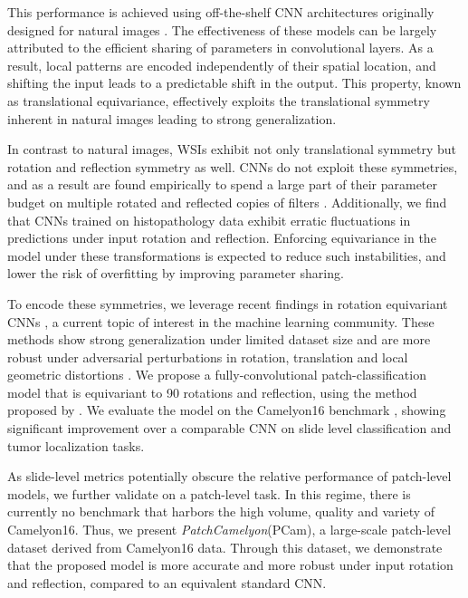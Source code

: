 \documentclass{llncs}
\begin{document}
    This performance is achieved using off-the-shelf CNN architectures originally designed for natural images \cite{Litjens2017-zt}. The effectiveness of these models can be largely attributed to the efficient sharing of parameters in convolutional layers. As a result, local patterns are encoded independently of their spatial location, and shifting the input leads to a predictable shift in the output. This property, known as translational equivariance, effectively exploits the translational symmetry inherent in natural images leading to strong generalization.
    

    
    In contrast to natural images, WSIs exhibit not only translational symmetry but rotation and reflection symmetry as well. CNNs do not exploit these symmetries, and as a result are found empirically to spend a large part of their parameter budget on multiple rotated and reflected copies of filters \cite{zeiler2014visualizing}.  Additionally, we find that CNNs trained on histopathology data exhibit erratic fluctuations in predictions under input rotation and reflection. Enforcing equivariance in the model under these transformations is expected to reduce such instabilities, and lower the risk of overfitting by improving parameter sharing.


    
    To encode these symmetries, we leverage recent findings in rotation equivariant CNNs \cite{Cohen2016-do,Worrall2017-ji,Weiler2017-oz}, a current topic of interest in the machine learning community. These methods show strong generalization under limited dataset size and are more robust under adversarial perturbations in rotation, translation and local geometric distortions \cite{Dumont2018-fa}. We propose a fully-convolutional patch-classification model that is equivariant to 90 rotations and reflection, using the method proposed by \cite{Cohen2016-do}. We evaluate the model on the Camelyon16 benchmark \cite{Ehteshami_Bejnordi2017-pt}, showing significant improvement over a comparable CNN on slide level classification and tumor localization tasks. 
    
    As slide-level metrics potentially obscure the relative performance of patch-level models, we further validate on a patch-level task. In this regime, there is currently no benchmark that harbors the high volume, quality and variety of Camelyon16. Thus, we present \textit{PatchCamelyon}(PCam), a large-scale patch-level dataset derived from Camelyon16 data. Through this dataset, we demonstrate that the proposed model is more accurate and more robust under input rotation and reflection, compared to an equivalent standard CNN.
    
\end{document}
